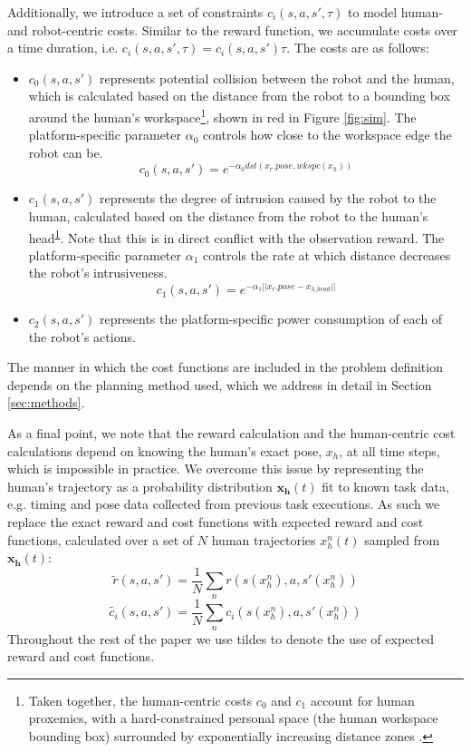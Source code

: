 \documentclass[letterpaper, 10 pt, conference]{ieeeconf}  %
\newcommand{\savefootnote}[2]{\footnote{\label{#1}#2}}
\newcommand{\repeatfootnote}[1]{\textsuperscript{\ref{#1}}}
\begin{document}
Additionally, we introduce a set of constraints $c_i(s,a,s',\tau)$ to model human- and robot-centric costs.  Similar to the reward function, we accumulate costs over a time duration, i.e. $c_i(s,a,s',\tau)=c_i(s,a,s')\tau$.  The costs are as follows:
\begin{itemize}
  \item $c_0(s,a,s')$ represents potential collision between the robot and the human, which is calculated based on the distance from the robot to a bounding box around the human's workspace\savefootnote{foot:cost}{Taken together, the human-centric costs $c_0$ and $c_1$ account for human proxemics, with a hard-constrained personal space (the human workspace bounding box) surrounded by exponentially increasing distance zones \cite{edward1966hall}.}, shown in red in Figure \ref{fig:sim}.  The platform-specific parameter $\alpha_0$ controls how close to the workspace edge the robot can be.
  \begin{equation}
  c_0(s,a,s') = e^{-\alpha_0dst(x_r.pose, wkspc(x_h))}
  \label{eq:collision}
  \end{equation}
  \item $c_1(s,a,s')$ represents the degree of intrusion caused by the robot to the human, calculated based on the distance from the robot to the human's head\repeatfootnote{foot:cost}.  Note that this is in direct conflict with the observation reward.  The platform-specific parameter $\alpha_1$ controls the rate at which distance decreases the robot's intrusiveness.
  \begin{equation}
  c_1(s,a,s') = e^{-\alpha_1||x_r.pose - x_{h\_head}||}
  \label{eq:intrusion}
  \end{equation}
  \item $c_2(s,a,s')$ represents the platform-specific power consumption of each of the robot's actions.
\end{itemize}

The manner in which the cost functions are included in the problem definition depends on the planning method used, which we address in detail in Section \ref{sec:methods}.

As a final point, we note that the reward calculation and the human-centric cost calculations depend on knowing the human's exact pose, $x_h$, at all time steps, which is impossible in practice.  We overcome this issue by representing the human's trajectory as a probability distribution $\mathbf{x_h}(t)$ fit to known task data, e.g. timing and pose data collected from previous task executions.  As such we replace the exact reward and cost functions with expected reward and cost functions, calculated over a set of $N$ human trajectories $x^n_h(t)$ sampled from $\mathbf{x_h}(t)$:
\begin{equation}
\label{eq:expr}
\tilde{r}(s,a,s')=\frac{1}{N}\sum_n{r(s(x^n_h), a, s'(x^n_h))}
\end{equation}
\begin{equation}
\label{eq:expc}
\tilde{c_i}(s,a,s')=\frac{1}{N}\sum_n{c_i(s(x^n_h), a, s'(x^n_h))}
\end{equation}
Throughout the rest of the paper we use tildes to denote the use of expected reward and cost functions.
\end{document}
